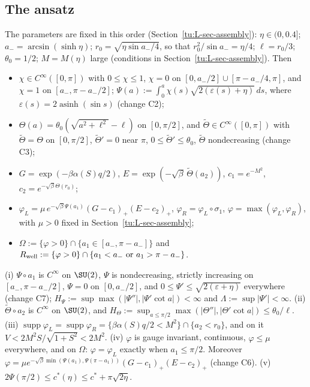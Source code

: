 \subsection{The ansatz}\label{tu:L-ansatz}

The parameters are fixed in this order (Section~\ref{tu:L-sec-assembly}): $\eta\in(0,0.4]$;
$a_-=\arcsin(\sinh\eta)$; $r_0=\sqrt{\eta\sin a_-/4}$, so that $r_0^2/\sin a_-=\eta/4$; $\ell=r_0/3$;
$\theta_0=1/2$; $M=M(\eta)$ large (conditions in Section~\ref{tu:L-sec-assembly}). Then
\begin{itemize}
\item $\chi\in C^\infty([0,\pi])$ with $0\le\chi\le1$, $\chi=0$ on $[0,a_-/2]\cup[\pi-a_-/4,\pi]$, and
$\chi=1$ on $[a_-,\pi-a_-/2]$; $\Psi(a):=\int_0^a\chi(s)\sqrt{2(\varepsilon(s)+\eta)}\,ds$, where
$\varepsilon(s)=2\operatorname{asinh}(\sin s)$ (change C2);
\item $\Theta(a)=\theta_0(\sqrt{a^2+\ell^2}-\ell)$ on $[0,\pi/2]$, and $\tilde\Theta\in C^\infty([0,\pi])$
with $\tilde\Theta=\Theta$ on $[0,\pi/2]$, $\tilde\Theta'=0$ near $\pi$, $0\le\tilde\Theta'\le\theta_0$,
$\tilde\Theta$ nondecreasing (change C3);
\item $G=\exp(-\beta\alpha(S)q/2)$, $E=\exp(-\sqrt\beta\,\tilde\Theta(a_2))$, $c_1=e^{-M^2}$,
$c_2=e^{-\sqrt\beta\Theta(r_0)}$;
\item $\varphi_L=\mu\,e^{-\sqrt\beta\Psi(a_1)}(G-c_1)_+(E-c_2)_+$, $\varphi_R=\varphi_L\circ\sigma_1$,
$\varphi=\max(\varphi_L,\varphi_R)$, with $\mu>0$ fixed in Section~\ref{tu:L-sec-assembly};
\item $\Omega:=\{\varphi>0\}\cap\{a_1\in[a_-,\pi-a_-]\}$ and
$R_{\rm well}:=\{\varphi>0\}\cap\{a_1<a_-\text{ or }a_1>\pi-a_-\}$.
\end{itemize}

\begin{lemma}\label{tu:L-ansatz-props}
(i) $\Psi\circ a_1$ is $C^\infty$ on $\SU(2)$, $\Psi$ is nondecreasing, strictly increasing on
$[a_-,\pi-a_-/2]$, $\Psi=0$ on $[0,a_-/2]$, and $0\le\Psi'\le\sqrt{2(\varepsilon+\eta)}$ everywhere
(change C7); $H_\Psi:=\sup\max(|\Psi''|,|\Psi'\cot a|)<\infty$ and $\Lambda:=\sup|\Psi'|<\infty$.
(ii) $\tilde\Theta\circ a_2$ is $C^\infty$ on $\SU(2)$, and $H_\Theta:=\sup_{a\le\pi/2}\max(|\Theta''|,|\Theta'\cot a|)\le\theta_0/\ell$.
(iii) $\operatorname{supp}\varphi_L=\operatorname{supp}\varphi_R=\{\beta\alpha(S)q/2<M^2\}\cap\{a_2<r_0\}$,
and on it $V<2M^2S/\sqrt{1+S^2}<2M^2$.
(iv) $\varphi$ is gauge invariant, continuous, $\varphi\le\mu$ everywhere, and on $\Omega$:
$\varphi=\varphi_L$ exactly when $a_1\le\pi/2$. Moreover
$\varphi=\mu e^{-\sqrt\beta\min(\Psi(a_1),\Psi(\pi-a_1))}(G-c_1)_+(E-c_2)_+$ (change C6).
(v) $2\Psi(\pi/2)\le c^*(\eta)\le c^*+\pi\sqrt{2\eta}$.
\end{lemma}

